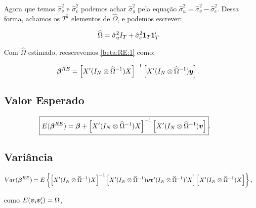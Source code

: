 \documentclass[11pt,oneside,a4paper]{article}
\numberwithin{equation}{section}
\begin{document}
Agora que temos $\hat{\sigma}^2_{v}$ e $\hat{\sigma}^2_{c}$ podemos achar $\hat{\sigma}^{2}_{u}$ pela equação $\boxed{\hat{\sigma}_{u}^{2} = \hat{\sigma}_{v}^{2} - \hat{\sigma}_{c}^{2}}$.
Dessa forma, achamos os $T^2$ elementos de $\widehat{\Omega}$, e podemos escrever:

\vspace{-1 em}
\begin{align*}
\widehat{\Omega}
= 
\hat{\sigma}^{2}_{u} I_{T} + \hat{\sigma}_{c}^{2} \boldsymbol{1}_{T} \boldsymbol{1}_{T}'
\end{align*}

Com $\widehat{\Omega}$ estimado, reescrevemos \eqref{beta:RE:1} como:

\vspace{-1 em}
\begin{align} \label{beta:RE:2}
\boldsymbol{\beta}^{RE} = 
\left[ X' (I_{N} \otimes \widehat{\Omega}^{-1}) X \right]^{-1}
\left[ X' (I_{N} \otimes \widehat{\Omega}^{-1}) \boldsymbol{y} \right].
\end{align}


\subsection*{Valor Esperado}

\vspace{-1 em}
\begin{align*}
	\Aboxed{
E( \mbs{\beta}^{RE} ) = 
\mbs{\beta} +
\left[ X' (I_{N} \otimes \widehat{\Omega}^{-1}) X \right]^{-1}
\left[ X' (I_{N} \otimes \widehat{\Omega}^{-1}) \mbs{v} \right] }.
\end{align*}

\subsection*{Variância}

\vspace{-1 em}
\begin{align*} 
Var( \boldsymbol{\beta}^{RE} ) = 
E
\left\{ 
\left[ X' ( I_{N} \otimes \widehat{\Omega}^{-1} ) X \right]^{-1}
\left[
X' ( I_{N} \otimes \widehat{\Omega}^{-1} )
\boldsymbol{v} \boldsymbol{v}'
( I_{N} \otimes \widehat{\Omega}^{-1} )' X
\right]
\left[ X' ( I_{N} \otimes \widehat{\Omega}^{-1} ) X \right]
\right\},
\end{align*}

\noindent
como $E( \boldsymbol{v}_{i} \boldsymbol{v}_{i}' ) =\Omega$,
\end{document}

